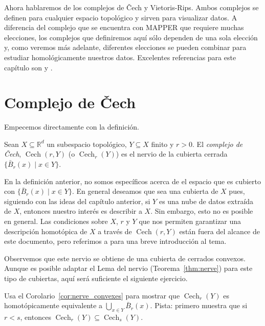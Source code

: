 \documentclass{standalone}
\begin{document}
	Ahora hablaremos de los complejos de \v{C}ech y Vietoris-Rips. Ambos complejos se definen para cualquier espacio topológico y sirven para visualizar datos. A diferencia del complejo que se encuentra con MAPPER que requiere muchas elecciones, los complejos que definiremos aquí sólo dependen de una sola elección y, como veremos más adelante, diferentes elecciones se pueden combinar para estudiar homológicamente nuestros datos. Excelentes referencias para este capítulo son \cite[Capítulo III]{edelsbrunner:2010:computational} y \cite[Capítulo 10]{edelsbrunner:2014:computational}.
	
	\section{Complejo de \v{C}ech}
	Empecemos directamente con la definición.
	
	\begin{definition}\label{def:cech}
		Sean $X\subseteq\mathbb{R}^{d}$ un subespacio topológico, $Y\subseteq X$ finito y $r>0$. El \emph{complejo de \v{C}ech}, $\operatorname{Cech}(r,Y)$ (o $\operatorname{Cech}_{r}(Y)$) es el nervio de la cubierta cerrada $\{\bar{B}_{r}(x)\mid x\in Y\}$.
	\end{definition}
	
	\begin{remark}
		En la definición anterior, no somos específicos acerca de el espacio que es cubierto con $\{\bar{B}_{r}(x)\mid x\in Y\}$. En general deseamos que sea una cubierta de $X$ pues, siguiendo con las ideas del capítulo anterior, si $Y$ es una nube de datos extraída de $X$, entonces nuestro interés es describir a $X$. Sin embargo, esto no es posible en general. Las condiciones sobre $X$, $r$ y $Y$ que nos permiten garantizar una descripción homotópica de $X$ a través de $\operatorname{Cech}(r,Y)$ están fuera del alcance de este documento, pero referimos a \cite[Section 4.2]{chazal:frontiers} para una breve introducción al tema.
	\end{remark}
	
	Observemos que este nervio se obtiene de una cubierta de cerrados convexos. Aunque es posible adaptar el Lema del nervio (Teorema~\ref{thm:nerve}) para este tipo de cubiertas, aquí será suficiente el siguiente ejercicio.
	
	\begin{exercise}
		Usa el Corolario~\ref{cor:nerve_convexes} para mostrar que $\operatorname{Cech}_{r}(Y)$ es homotópicamente equivalente a $\bigcup_{x\in Y}\bar{B}_{r}(x)$. Pista: primero muestra que si $r<s$, entonces $\operatorname{Cech}_{r}(Y)\subseteq\operatorname{Cech}_{s}(Y)$.
	\end{exercise}
	
\end{document}
